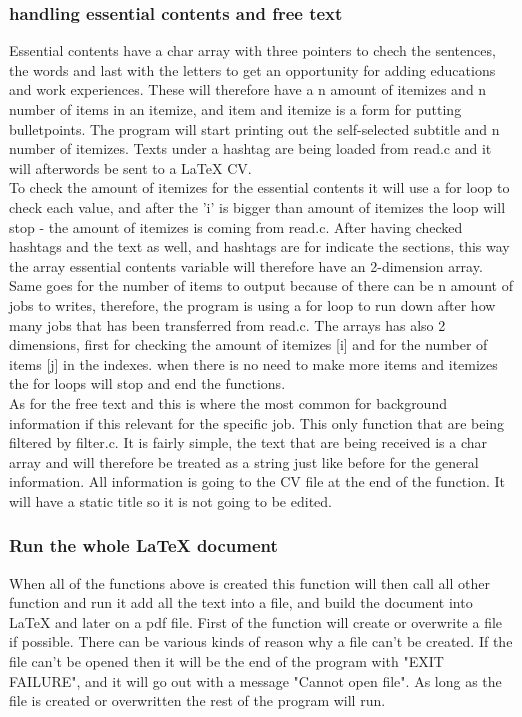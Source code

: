 \subsubsection{handling essential contents and free text}
Essential contents have a char array with three pointers to chech the sentences,
the words and last with the letters to get an opportunity for adding educations and work experiences.
These will therefore have a n amount of itemizes and n number of items in an itemize, 
and item and itemize is a form for putting bulletpoints.
The program will start printing out the self-selected subtitle and n number of itemizes.
Texts under a hashtag are being loaded from read.c and it will afterwords be sent to a LaTeX CV.\\
 
To check the amount of itemizes for the essential contents it will use a for loop to check each value,
and after the 'i' is bigger than amount of itemizes the loop will stop - the amount of itemizes is coming from read.c.
After having checked hashtags and the text as well, and hashtags are for indicate the sections,
this way the array essential contents variable will therefore have an 2-dimension array.
Same goes for the number of items to output because of there can be n amount of jobs to writes, 
therefore, the program is using a for loop to run down after how many jobs that has been transferred from read.c.
The arrays has also 2 dimensions, first for checking the amount of itemizes [i] and for the number of items [j] in the indexes.
when there is no need to make more items and itemizes the for loops will stop and end the functions. \\

As for the free text and this is where the most common for background information if this relevant for the specific job.
This only function that are being filtered by filter.c. It is fairly simple, 
the text that are being received is a char array and will therefore be treated as a string 
just like before for the general information. All information is going to the CV file at the end of the function.
It will have a static title so it is not going to be edited.

\subsubsection{Run the whole LaTeX document}
When all of the functions above is created this function will then call all other function and run it add all the text into a file,
and build the document into LaTeX and later on a pdf file.
First of the function will create or overwrite a file if possible. There can be various kinds of reason why a file can't be created.
If the file can't be opened then it will be the end of the program with "EXIT FAILURE", 
and it will go out with a message "Cannot open file".
As long as the file is created or overwritten the rest of the program will run.\\

